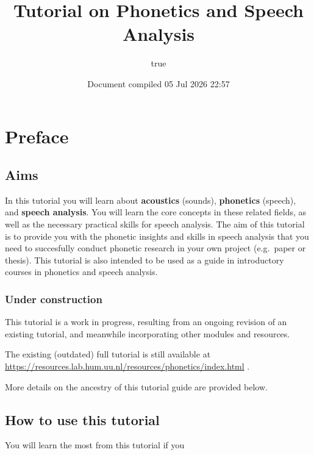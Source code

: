 \documentclass[
]{book}
\title{Tutorial on Phonetics and Speech Analysis}
\author{true}
\date{Document compiled 05 Jul 2026 22:57}
\begin{document}
\maketitle

{
\setcounter{tocdepth}{1}
\tableofcontents
}
\chapter*{Preface}\label{preface}

\section*{Aims}\label{aims}

In this tutorial you will learn about \textbf{acoustics} (sounds), \textbf{phonetics} (speech), and \textbf{speech analysis}.
You will learn the core concepts in these related fields, as well as the necessary practical skills for speech analysis.
The aim of this tutorial is to provide you with the phonetic insights and skills in speech analysis that you need to succesfully conduct phonetic research in your own project (e.g.~paper or thesis). This tutorial is also intended to be used as a guide in introductory courses in phonetics and speech analysis.

\subsection*{Under construction}\label{under-construction}

This tutorial is a work in progress, resulting from an ongoing revision of an existing tutorial, and meanwhile incorporating other modules and resources.

The existing (outdated) full tutorial is still available at \url{https://resources.lab.hum.uu.nl/resources/phonetics/index.html}
.

More details on the ancestry of this tutorial guide are provided below.

\section*{How to use this tutorial}\label{how-to-use-this-tutorial}

You will learn the most from this tutorial if you
\end{document}
